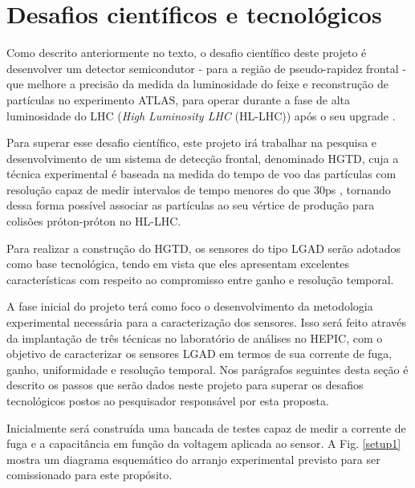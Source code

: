 \chapter{Desafios científicos e tecnológicos}

Como descrito anteriormente no texto, o desafio científico deste projeto é desenvolver um detector semicondutor - para a região de pseudo-rapidez frontal - que melhore a precisão da medida da luminosidade do feixe e reconstrução de partículas no experimento ATLAS, para operar durante a fase de alta luminosidade do LHC ({\it High Luminosity LHC} (HL-LHC)) após o seu upgrade \cite{tdr}. 

Para superar esse desafio científico, este projeto irá trabalhar na pesquisa e desenvolvimento de um sistema de detecção frontal, denominado HGTD, cuja a técnica experimental é baseada na medida do tempo de voo das partículas com resolução capaz de medir intervalos de tempo menores do que 30ps \cite{tdr}, tornando dessa forma possível associar as partículas ao seu vértice de produção para colisões próton-próton no HL-LHC.

Para realizar a construção do HGTD, os sensores do tipo LGAD serão adotados como base tecnológica, tendo em vista que eles apresentam excelentes características com respeito ao compromisso entre ganho e resolução temporal. 

A fase inicial do projeto terá como foco o desenvolvimento da metodologia experimental necessária para a caracterização dos sensores. Isso será feito através da implantação de três técnicas no laboratório de análises no HEPIC, com o objetivo de caracterizar os sensores LGAD em termos de sua corrente de fuga, ganho, uniformidade e resolução temporal. Nos parágrafos seguintes desta seção é descrito os passos que serão dados neste projeto para superar os desafios tecnológicos postos ao pesquisador responsável por esta proposta. 

Inicialmente será construída uma bancada de testes capaz de medir a corrente de fuga e a capacitância em função da voltagem aplicada ao sensor. A Fig. \ref{setup1} mostra um diagrama esquemático do arranjo experimental previsto para ser comissionado para este propósito.

